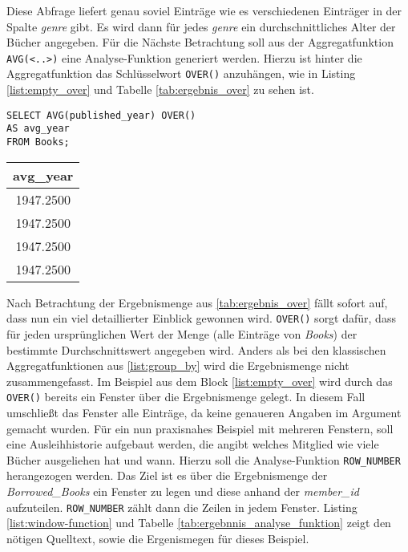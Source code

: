 Diese Abfrage liefert genau soviel Einträge wie es verschiedenen Einträger in der
Spalte \textit{genre} gibt. Es wird dann für jedes \textit{genre} ein durchschnittliches
Alter der Bücher angegeben. Für die Nächste Betrachtung soll aus der
Aggregatfunktion \texttt{AVG(<..>)} eine Analyse-Funktion generiert werden.
Hierzu ist hinter die Aggregatfunktion das Schlüsselwort \texttt{OVER()} anzuhängen,
wie in Listing \ref{list:empty_over} und Tabelle \ref{tab:ergebnis_over} zu
sehen ist.

\begin{minipage}{0.60\textwidth}
	\begin{lstlisting}
SELECT AVG(published_year) OVER()
AS avg_year
FROM Books;
	\end{lstlisting}
\end{minipage}
\hfill
\begin{minipage}{0.45\textwidth}
	\centering
	\begin{tabular}{|c|}
		\hline
		\textbf{avg\_year} \\
		\hline
		1947.2500          \\
		\hline
		1947.2500          \\
		\hline
		1947.2500          \\
		\hline
		1947.2500          \\
		\hline
	\end{tabular}
	 \label{tab:ergebnis_over}
\end{minipage}

Nach Betrachtung der Ergebnismenge aus \ref{tab:ergebnis_over} fällt sofort auf,
dass nun ein viel detaillierter Einblick gewonnen wird. \texttt{OVER()} sorgt
dafür, dass für jeden ursprünglichen Wert der Menge (alle Einträge von \textit{Books})
der bestimmte Durchschnittswert angegeben wird. Anders als bei den klassischen Aggregatfunktionen
aus \ref{list:group_by} wird die Ergebnismenge nicht zusammengefasst. Im
Beispiel aus dem Block \ref{list:empty_over} wird durch das \texttt{OVER()} bereits
ein Fenster über die Ergebnismenge gelegt. In diesem Fall umschließt das Fenster
alle Einträge, da keine genaueren Angaben im Argument gemacht wurden. Für ein
nun praxisnahes Beispiel mit mehreren Fenstern, soll eine Ausleihhistorie aufgebaut
werden, die angibt welches Mitglied wie viele Bücher ausgeliehen hat und wann. Hierzu
soll die Analyse-Funktion \texttt{ROW\_NUMBER} herangezogen werden. Das Ziel ist
es über die Ergebnismenge der \textit{Borrowed\_Books} ein Fenster zu legen und
diese anhand der \textit{member\_id} aufzuteilen. \texttt{ROW\_NUMBER} zählt dann
die Zeilen in jedem Fenster. Listing \ref{list:window-function} und Tabelle
\ref{tab:ergebnnis_analyse_funktion} zeigt den nötigen Quelltext, sowie die Ergenismegen
für dieses Beispiel.

